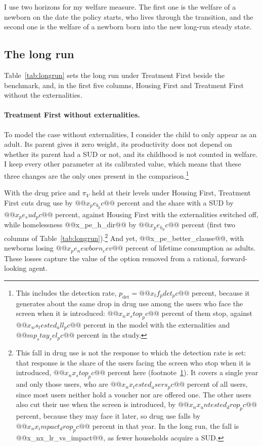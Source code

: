 \documentclass[10pt]{article}
\begin{document}
  I use two horizons for my welfare measure. The first one is the welfare of a newborn on the date the policy starts, who lives through the transition, and the second one is the welfare of a newborn born into the new long-run steady state.

\subsection{The long run}\label{sec:longrun}

Table~\ref{tab:longrun} sets the long run under Treatment First beside the benchmark, and, in the first five columns, Housing First and Treatment First without the externalities.

\paragraph{Treatment First without externalities.}   To model the case without externalities, I consider the child to only appear as an adult. Its parent gives it zero weight, its productivity does not depend on whether its parent had a SUD or not, and its childhood is not counted in welfare. I keep every other parameter at its calibrated value, which means that these three changes are the only ones present in the comparison.\footnote{\label{fn:nxpdet}This includes the detection rate, $p_{\mathrm{det}}=@@x_tf_pdet_pc@@$ percent, because it generates about the same drop in drug use among the users who face the screen when it is introduced: $@@x_nx_stop_pc@@$ percent of them stop, against $@@x_ws_tested_all_pc@@$ percent in the model with the externalities and $@@mp_stay_rel_pc@@$ percent in the study.}

With the drug price and $\pi_V$ held at their levels under Housing First, Treatment First cuts drug use by $@@x_pe_b_pc@@$ percent and the share with a SUD by $@@x_pe_sud_pc@@$ percent, against Housing First with the externalities switched off, while homelessness @@x_pe_h_dir@@ by $@@x_pe_h_pc@@$ percent (first two columns of Table~\ref{tab:longrun}).\footnote{\label{fn:pe61}This fall in drug use is not the response to which the detection rate is set: that response is the share of the users facing the screen who stop when it is introduced, $@@x_nx_stop_pc@@$ percent here (footnote~\ref{fn:nxpdet}). It covers a single year and only those users, who are $@@x_nx_tested_users_pc@@$ percent of all users, since most users neither hold a voucher nor are offered one. The other users also cut their use when the screen is introduced, by $@@x_nx_untested_drop_pc@@$ percent, because they may face it later, so drug use falls by $@@x_nx_impact_drop_pc@@$ percent in that year. In the long run, the fall is @@x_nx_lr_vs_impact@@, as fewer households acquire a SUD.} And yet, @@x_pe_better_clause@@, with newborns losing $@@x_pe_newborn_cev@@$ percent of lifetime consumption as adults. These losses capture the value of the option removed from a rational, forward-looking agent.
\end{document}
